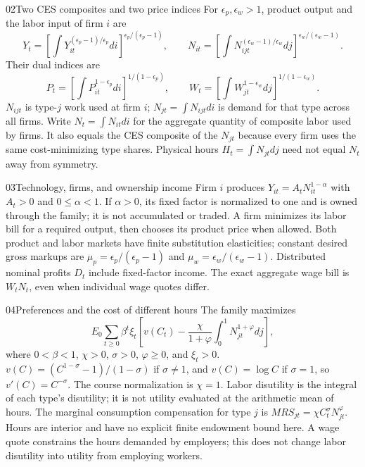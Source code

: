 \begin{modelsetup}[1]
\begin{modelcondition}{02}{Two CES composites and two price indices}
For $\epsilon_p,\epsilon_w>1$, product output and the labor input of firm $i$ are
\[
 Y_t=\left[\int Y_{it}^{(\epsilon_p-1)/\epsilon_p}di\right]^{\epsilon_p/(\epsilon_p-1)},
 \qquad N_{it}=\left[\int N_{ijt}^{(\epsilon_w-1)/\epsilon_w}dj\right]^{\epsilon_w/(\epsilon_w-1)}.
\]
Their dual indices are
\[
 P_t=\left[\int P_{it}^{1-\epsilon_p}di\right]^{1/(1-\epsilon_p)},
 \qquad W_t=\left[\int W_{jt}^{1-\epsilon_w}dj\right]^{1/(1-\epsilon_w)}.
\]
$N_{ijt}$ is type-$j$ work used at firm $i$; $N_{jt}=\int N_{ijt}di$ is demand
for that type across all firms. Write $N_t=\int N_{it}di$ for the aggregate
quantity of composite labor used by firms. It also equals the CES composite
of the $N_{jt}$ because every firm uses the same cost-minimizing type shares.
Physical hours $H_t=\int N_{jt}dj$ need not equal $N_t$ away from symmetry.
\end{modelcondition}
\end{modelsetup}

\begin{modelsetup}[1]
\begin{modelcondition}{03}{Technology, firms, and ownership income}
Firm $i$ produces $Y_{it}=A_tN_{it}^{1-\alpha}$ with $A_t>0$ and
$0\leq\alpha<1$. If $\alpha>0$, its fixed factor is normalized to one and is
owned through the family; it is not accumulated or traded. A firm minimizes
its labor bill for a required output, then chooses its product price when
allowed. Both product and labor markets have finite substitution elasticities;
constant desired gross markups are $\mu_p=\epsilon_p/(\epsilon_p-1)$ and
$\mu_w=\epsilon_w/(\epsilon_w-1)$. Distributed nominal profits $D_t$ include
fixed-factor income. The exact aggregate wage bill is $W_tN_t$, even when
individual wage quotes differ.
\end{modelcondition}
\end{modelsetup}

\begin{modelsetup}[1]
\begin{modelcondition}{04}{Preferences and the cost of different hours}
The family maximizes
\[
 E_0\sum_{t\geq0}\beta^t\xi_t
 \left[v(C_t)-\frac\chi{1+\varphi}\int_0^1N_{jt}^{1+\varphi}dj\right],
\]
where $0<\beta<1$, $\chi>0$, $\sigma>0$, $\varphi\geq0$, and $\xi_t>0$.
$v(C)=(C^{1-\sigma}-1)/(1-\sigma)$ if $\sigma\ne1$, and $v(C)=\log C$ if
$\sigma=1$, so $v'(C)=C^{-\sigma}$. The course normalization is $\chi=1$.
Labor disutility is the integral of each type's disutility; it is not utility
evaluated at the arithmetic mean of hours. The marginal consumption compensation
for type $j$ is $MRS_{jt}=\chi C_t^\sigma N_{jt}^{\varphi}$. Hours are interior
and have no explicit finite endowment bound here. A wage quote constrains the
hours demanded by employers; this does not change labor disutility into utility
from employing workers.
\end{modelcondition}
\end{modelsetup}

